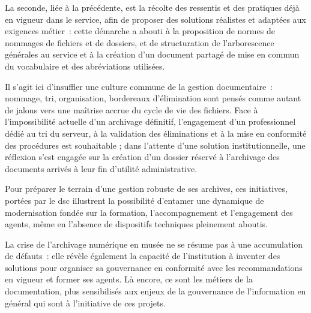 La seconde, liée à la précédente, est la récolte des ressentis et des pratiques déjà en vigueur dans le service, afin de proposer des solutions réalistes et adaptées aux exigences métier~: cette démarche a abouti à la proposition de normes de nommages de fichiers et de dossiers, et de structuration de l'arborescence générales au service et à la création d'un document partagé de mise en commun du vocabulaire et des abréviations utilisées.


Il s’agit ici d’insuffler une culture commune de la gestion documentaire~: nommage, tri, organisation, bordereaux d’élimination sont pensés comme autant de jalons vers une maîtrise accrue du cycle de vie des fichiers. Face à l’impossibilité actuelle d’un archivage définitif, l'engagement d'un professionnel dédié au tri du serveur, à la validation des éliminations et à la mise en conformité des procédures est souhaitable ; dans l'attente d'une solution institutionnelle, une réflexion s’est engagée sur la création d’un dossier réservé à l'archivage des documents arrivés à leur fin d'utilité administrative.


Pour préparer le terrain d'une gestion robuste de ses archives, ces initiatives, portées par le \ac{dsc} illustrent la possibilité d’entamer une dynamique de modernisation fondée sur la formation, l’accompagnement et l’engagement des agents, même en l’absence de dispositifs techniques pleinement aboutis.

\bigskip
\bigskip
\bigskip

La crise de l’archivage numérique en musée ne se résume pas à une accumulation de défauts~: elle révèle également la capacité de l’institution à inventer des solutions pour organiser sa gouvernance en conformité avec les recommandations en vigueur et former ses agents. Là encore, ce sont les métiers de la documentation, plus sensibilisés aux enjeux de la gouvernance de l'information en général qui sont à l'initiative de ces projets.